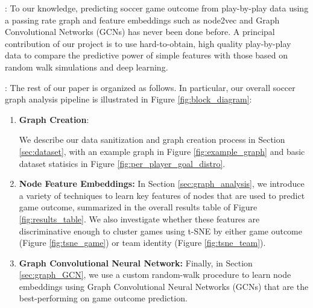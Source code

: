 
:
To our knowledge, predicting soccer game outcome from play-by-play data using a passing rate graph and feature embeddings such as node2vec and Graph Convolutional Networks (GCNs) has never been done before.
A principal contribution of our project is to use hard-to-obtain, high quality play-by-play data
to compare the predictive power of simple features with those based on random walk simulations and deep learning.

:
The rest of our paper is organized as follows. In particular, our overall soccer graph analysis pipeline is illustrated in Figure \ref{fig:block_diagram}:

\begin{enumerate}

\item \textbf{Graph Creation}:

We describe our data sanitization and graph creation process in Section \ref{sec:dataset}, with an example graph in Figure \ref{fig:example_graph} and basic dataset statisics in Figure \ref{fig:per_player_goal_distro}.

\item \textbf{Node Feature Embeddings:}
In Section \ref{sec:graph_analysis}, we introduce a variety of techniques to learn key features of nodes that are used to predict game outcome, summarized in the overall results table of Figure \ref{fig:results_table}. We also investigate whether these features are discriminative enough to cluster games using t-SNE by either game outcome (Figure \ref{fig:tsne_game}) or team identity (Figure \ref{fig:tsne_team}).

\item \textbf{Graph Convolutional Neural Network:}
Finally, in Section \ref{sec:graph_GCN}, we use a custom random-walk procedure to learn node embeddings using Graph Convolutional Neural Networks (GCNs) that are the best-performing on game outcome prediction.


\end{enumerate}

